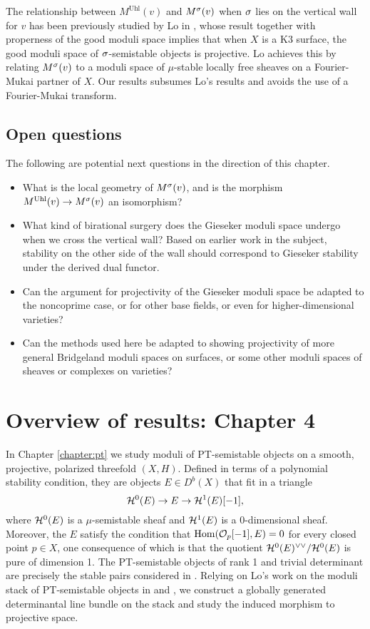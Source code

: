 The relationship between $M^{\mathrm{Uhl}}(v)$ and $M^\sigma(v)$ when $\sigma$ lies on the vertical wall for $v$ has been previously studied by Lo in \cite{lo}, whose result together with properness of the good moduli space implies that when $X$ is a K3 surface, the good moduli space of $\sigma$-semistable objects is projective. Lo achieves this by relating $M^\sigma(v)$ to a moduli space of $\mu$-stable locally free sheaves on a Fourier-Mukai partner of $X$. Our results subsumes Lo's results and avoids the use of a Fourier-Mukai transform.

\subsection*{Open questions}
The following are potential next questions in the direction of this chapter.
\begin{itemize}
    \item What is the local geometry of $M^\sigma(v)$, and is the morphism $M^{\mathrm{Uhl}}(v) \to M^\sigma(v)$ an isomorphism?
    \item What kind of birational surgery does the Gieseker moduli space undergo when we cross the vertical wall? Based on earlier work in the subject, stability on the other side of the wall should correspond to Gieseker stability under the derived dual functor.
    \item Can the argument for projectivity of the Gieseker moduli space be adapted to the noncoprime case, or for other base fields, or even for higher-dimensional varieties?
    \item Can the methods used here be adapted to showing projectivity of more general Bridgeland moduli spaces on surfaces, or some other moduli spaces of sheaves or complexes on varieties?
\end{itemize}

\section{Overview of results: Chapter 4}
In Chapter \ref{chapter:pt} we study moduli of PT-semistable objects on a smooth, projective, polarized threefold $(X, H)$. Defined in terms of a polynomial stability condition, they are objects $E \in D^b(X)$ that fit in a triangle
\[ \mathcal{H}^0(E) \to E \to \mathcal{H}^1(E)[-1], \]
where $\mathcal{H}^0(E)$ is a $\mu$-semistable sheaf and $\mathcal{H}^1(E)$ is a 0-dimensional sheaf. Moreover, the $E$ satisfy the condition that $\mathrm{Hom}(\mathcal{O}_p[-1], E) = 0$ for every closed point $p \in X$, one consequence of which is that the quotient $\mathcal{H}^0(E)^{\vee\vee}/\mathcal{H}^0(E)$ is pure of dimension 1. The PT-semistable objects of rank 1 and trivial determinant are precisely the stable pairs considered in \cite{PT}. Relying on Lo's work on the moduli stack of PT-semistable objects in \cite{lo-PT1} and \cite{lo-PT2}, we construct a globally generated determinantal line bundle on the stack and study the induced morphism to projective space. 

